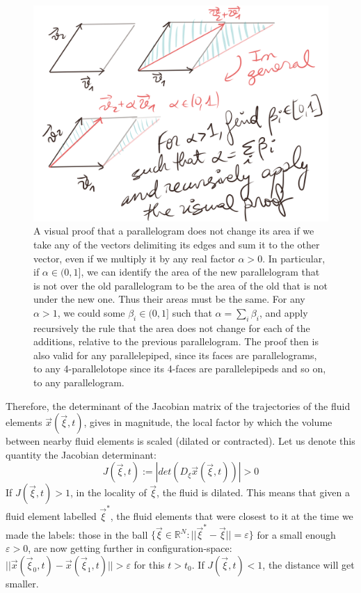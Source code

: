 \documentclass[11pt, a4paper]{article} %
\newcommand{\R}{\mathbb{R}} %
\begin{document}
\begin{figure}[h!]
  \centering
    \includegraphics[width=0.65\linewidth]{10parallelepipid.png}
  \caption{ A visual proof that a parallelogram does not change its area if we take any of the vectors delimiting its edges  and sum it to the other vector, even if we multiply it by any real factor $\alpha> 0$. In particular, if $\alpha\in(0,1]$, we can identify the area of the new parallelogram that is not over the old parallelogram to be the area of the old that is not under the new one. Thus their areas must be the same. For any $\alpha>1$, we could some $\beta_i\in(0,1]$ such that $\alpha=\sum_i\beta_i$, and apply recursively the rule that the area does not change for each of the additions, relative to the previous parallelogram. The proof then is also valid for any parallelepiped, since its faces are parallelograms, to any 4-parallelotope since its 4-faces are parallelepipeds and so on, to any parallelogram.  }
  \label{fig:volumeDet}
\end{figure}
Therefore, the determinant of the Jacobian matrix of the trajectories of the fluid elements $\vec{x}(\vec{\xi},t)$, gives in magnitude, the local factor by which the volume between nearby fluid elements is scaled (dilated or contracted). Let us denote this quantity the Jacobian determinant:
\begin{equation}
J(\vec{\xi},t):=|det (D_\xi \vec{x}(\vec{\xi},t))|>0
\end{equation}
If $J(\vec{\xi},t)>1$, in the locality of $\vec{\xi}$, the fluid is dilated. This means that given a fluid element labelled $\vec{\xi}^*$, the fluid elements that were closest to it at the time we made the labels: those in the ball $\{\vec{\xi}\in\R^N:||\vec{\xi}^*-\vec{\xi}||=\varepsilon\}$ for a small enough $\varepsilon>0$, are now getting further in configuration-space: $||\vec{x}(\vec{\xi}_0,t)-\vec{x}(\vec{\xi}_1,t)||>\varepsilon$ for this $t>t_0$. If $J(\vec{\xi},t)<1$, the distance will get smaller.
\end{document}
